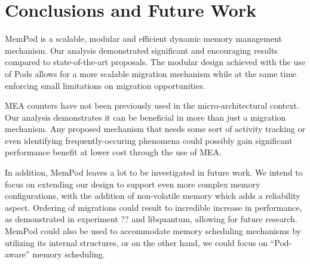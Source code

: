 \section{Conclusions and Future Work}
\label{sec:Conclusions}

MemPod is a scalable, modular and efficient dynamic memory management mechanism. Our analysis demonstrated significant and encouraging results compared to state-of-the-art proposals. The modular design achieved with the use of Pods allows for a more scalable migration mechanism while at the same time enforcing small limitations on migration opportunities.

MEA counters have not been previously used in the micro-architectural context. Our analysis demonstrates it can be beneficial in more than just a migration mechanism. Any proposed mechanism that needs some sort of activity tracking or even identifying frequently-occuring phenomena could possibly gain significant performance benefit at lower cost through the use of MEA.

In addition, MemPod leaves a lot to be investigated in future work. We intend to focus on extending our design to support even more complex memory configurations, with the addition of non-volatile memory which adds a reliability aspect. Ordering of migrations could result to incredible increase in performance, as demonstrated in experiment ?? and libquantum, allowing for future research. MemPod could also be used to accommodate memory scheduling mechanisms by utilizing its internal structures, or on the other hand, we could focus on ``Pod-aware'' memory scheduling.